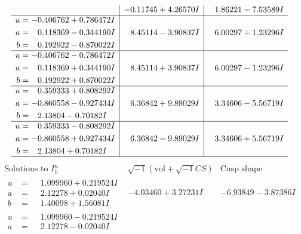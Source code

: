 \documentclass[1p]{elsarticle_modified}
\theoremstyle{definition}
\newcommand{\I}{\sqrt{-1}}
\begin{document}
$$\begin{array}{c|c|c}
 & -0.11745 + 4.26570 I & \phantom{-}1.86221 - 7.53589 I \\ \hline\begin{aligned}
u &= -0.406762 + 0.786472 I \\
a &= \phantom{-}0.118369 - 0.344190 I \\
b &= \phantom{-}0.192922 - 0.870022 I\end{aligned}
 & \phantom{-}8.45114 - 3.90837 I & \phantom{-}6.00297 + 1.23296 I \\ \hline\begin{aligned}
u &= -0.406762 - 0.786472 I \\
a &= \phantom{-}0.118369 + 0.344190 I \\
b &= \phantom{-}0.192922 + 0.870022 I\end{aligned}
 & \phantom{-}8.45114 + 3.90837 I & \phantom{-}6.00297 - 1.23296 I \\ \hline\begin{aligned}
u &= \phantom{-}0.359333 + 0.808292 I \\
a &= -0.860558 - 0.927434 I \\
b &= \phantom{-}2.13804 - 0.70182 I\end{aligned}
 & \phantom{-}6.36842 + 9.89029 I & \phantom{-}3.34606 - 5.56719 I \\ \hline\begin{aligned}
u &= \phantom{-}0.359333 - 0.808292 I \\
a &= -0.860558 + 0.927434 I \\
b &= \phantom{-}2.13804 + 0.70182 I\end{aligned}
 & \phantom{-}6.36842 - 9.89029 I & \phantom{-}3.34606 + 5.56719 I\\
 \hline 
 \end{array}$$\newpage$$\begin{array}{c|c|c}  
\text{Solutions to }I^u_{1}& \I (\text{vol} + \sqrt{-1}CS) & \text{Cusp shape}\\
 \hline 
\begin{aligned}
u &= \phantom{-}1.099960 + 0.219524 I \\
a &= \phantom{-}2.12278 + 0.02040 I \\
b &= \phantom{-}1.40098 + 1.56081 I\end{aligned}
 & -4.03460 + 3.27231 I & -6.93849 - 3.87386 I \\ \hline\begin{aligned}
u &= \phantom{-}1.099960 - 0.219524 I \\
a &= \phantom{-}2.12278 - 0.02040 I \\

\end{aligned}
\end{array}$$
\end{document}
